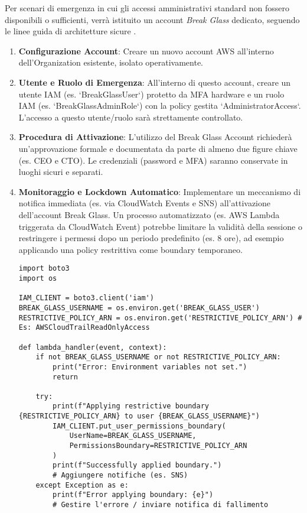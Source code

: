 Per scenari di emergenza in cui gli accessi amministrativi standard non fossero disponibili o sufficienti, verrà istituito un account \emph{Break Glass} dedicato, seguendo le linee guida di architetture sicure \cite{saraswat:breakglass}.
\begin{enumerate}
    \item \textbf{Configurazione Account}: Creare un nuovo account AWS all'interno dell'Organization esistente, isolato operativamente.
    \item \textbf{Utente e Ruolo di Emergenza}: All'interno di questo account, creare un utente IAM (es. `BreakGlassUser`) protetto da MFA hardware e un ruolo IAM (es. `BreakGlassAdminRole`) con la policy gestita `AdministratorAccess`. L'accesso a questo utente/ruolo sarà strettamente controllato.
    \item \textbf{Procedura di Attivazione}: L'utilizzo del Break Glass Account richiederà un'approvazione formale e documentata da parte di almeno due figure chiave (es. CEO e CTO). Le credenziali (password e MFA) saranno conservate in luoghi sicuri e separati.
    \item \textbf{Monitoraggio e Lockdown Automatico}: Implementare un meccanismo di notifica immediata (es. via CloudWatch Events e SNS) all'attivazione dell'account Break Glass. Un processo automatizzato (es. AWS Lambda triggerata da CloudWatch Event) potrebbe limitare la validità della sessione o restringere i permessi dopo un periodo predefinito (es. 8 ore), ad esempio applicando una policy restrittiva come boundary temporaneo.
    \begin{lstlisting}[style=python, caption={Esempio Lambda per limitare utente Break Glass (concettuale)}, label=lst:breakglass-lambda]
import boto3
import os

IAM_CLIENT = boto3.client('iam')
BREAK_GLASS_USERNAME = os.environ.get('BREAK_GLASS_USER')
RESTRICTIVE_POLICY_ARN = os.environ.get('RESTRICTIVE_POLICY_ARN') # Es: AWSCloudTrailReadOnlyAccess

def lambda_handler(event, context):
    if not BREAK_GLASS_USERNAME or not RESTRICTIVE_POLICY_ARN:
        print("Error: Environment variables not set.")
        return

    try:
        print(f"Applying restrictive boundary {RESTRICTIVE_POLICY_ARN} to user {BREAK_GLASS_USERNAME}")
        IAM_CLIENT.put_user_permissions_boundary(
            UserName=BREAK_GLASS_USERNAME,
            PermissionsBoundary=RESTRICTIVE_POLICY_ARN
        )
        print(f"Successfully applied boundary.")
        # Aggiungere notifiche (es. SNS)
    except Exception as e:
        print(f"Error applying boundary: {e}")
        # Gestire l'errore / inviare notifica di fallimento
\end{lstlisting}
\end{enumerate}

